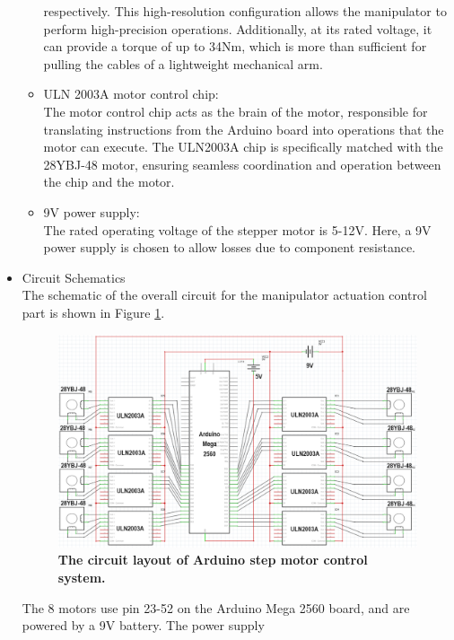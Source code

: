 \begin{itemize}
\begin{itemize}
        respectively. This high-resolution configuration allows the manipulator to perform high-precision 
        operations. Additionally, at its rated voltage, it can provide a torque of up to 34Nm, which is more than 
        sufficient for pulling the cables of a lightweight mechanical arm.
        \item ULN 2003A motor control chip: \\
        The motor control chip acts as the brain of the motor, responsible for translating instructions from the 
        Arduino board into operations that the motor can execute. The ULN2003A chip is specifically matched with 
        the 28YBJ-48 motor, ensuring seamless coordination and operation between the chip and the motor. 
        \item 9V power supply: \\
        The rated operating voltage of the stepper motor is 5-12V. Here, a 9V power supply is chosen to allow 
        losses due to component resistance. 
    \end{itemize}
    \item Circuit Schematics \\
    The schematic of the overall circuit for the manipulator actuation control part is shown in Figure \ref{fig:motor_circuit_layout}.
    \begin{figure}[H] %
        \centering 
        \captionsetup{labelsep=colon}
        \includegraphics[width=\textwidth]{Image/Design/arduino_circuit_layout.png} 
        \caption[The circuit layout of Arduino step motor control system]
        {\centering \textbf{The circuit layout of Arduino step motor control system.}}
        \label{fig:motor_circuit_layout}
    \end{figure}
    The 8 motors use pin 23-52 on the Arduino Mega 2560 board, and are powered by a 9V battery. The power supply 

\end{itemize}
